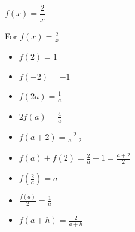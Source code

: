 {$f(x) = \dfrac{2}{x}$}
{For $f(x) = \frac{2}{x}$

\begin{itemize}
\item  $f(2) = 1$
\item  $f(-2) = -1$
\item  $f(2a) = \frac{1}{a}$
\item  $2 f(a) = \frac{4}{a}$
\item $f(a+2) = \frac{2}{a+2}$
\item $f(a) + f(2) = \frac{2}{a}+1 = \frac{a+2}{2}$
\item  $f \left( \frac{2}{a} \right) = a$
\item $\frac{f(a)}{2} =  \frac{1}{a}$
\item  $f(a + h) = \frac{2}{a+h}$
\end{itemize}
}